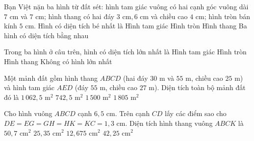 \begin{ex} %
Bạn Việt nặn ba hình từ đất sét: hình tam giác vuông có hai cạnh góc vuông dài $7\text{ cm}$ và $7\text{ cm}$; hình thang có hai đáy $3\text{ cm}, 6\text{ cm}$ và chiều cao $4\text{ cm}$; hình tròn bán kính $5\text{ cm}$. Hình có diện tích bé nhất là
\choice
{Hình tam giác}
{Hình tròn}
{\True Hình thang}
{Ba hình có diện tích bằng nhau}
\end{ex}

\begin{ex} %
Trong ba hình ở câu trên, hình có diện tích lớn nhất là
\choice
{Hình tam giác}
{\True Hình tròn}
{Hình thang}
{Không có hình lớn nhất}
\end{ex}

\begin{ex} %
Một mảnh đất gồm hình thang $ABCD$ (hai đáy $30\text{ m}$ và $55\text{ m}$, chiều cao $25\text{ m}$) và hình tam giác $AED$ (đáy $55\text{ m}$, chiều cao $27\text{ m}$). Diện tích toàn bộ mảnh đất đó là
\choice
{$1\,062{,}5\text{ m}^2$}
{$742{,}5\text{ m}^2$}
{$1\,500\text{ m}^2$}
{\True $1\,805\text{ m}^2$}
\end{ex}

\begin{ex} %
Cho hình vuông $ABCD$ cạnh $6{,}5\text{ cm}$. Trên cạnh $CD$ lấy các điểm sao cho $DE = EG = GH = HK = KC = 1{,}3\text{ cm}$. Diện tích hình thang vuông $ABCK$ là
\choice
{$50{,}7\text{ cm}^2$}
{\True $25{,}35\text{ cm}^2$}
{$12{,}675\text{ cm}^2$}
{$42{,}25\text{ cm}^2$}
\end{ex}

